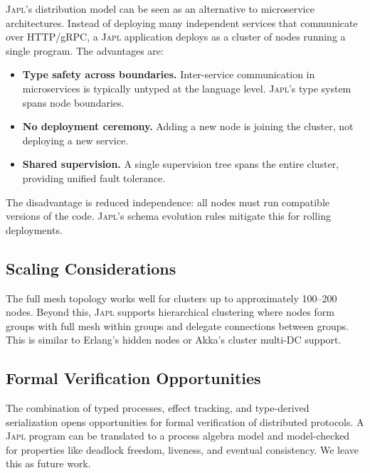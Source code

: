 \documentclass[11pt,a4paper]{article}
\newcommand{\japl}{\textsc{Japl}}
\begin{document}
\japl{}'s distribution model can be seen as an alternative to
microservice architectures. Instead of deploying many independent
services that communicate over HTTP/gRPC, a \japl{} application deploys
as a cluster of nodes running a single program. The advantages are:

\begin{itemize}[nosep]
  \item \textbf{Type safety across boundaries.} Inter-service communication
        in microservices is typically untyped at the language level.
        \japl{}'s type system spans node boundaries.
  \item \textbf{No deployment ceremony.} Adding a new node is joining
        the cluster, not deploying a new service.
  \item \textbf{Shared supervision.} A single supervision tree spans the
        entire cluster, providing unified fault tolerance.
\end{itemize}

The disadvantage is reduced independence: all nodes must run compatible
versions of the code. \japl{}'s schema evolution rules mitigate this for
rolling deployments.

\subsection{Scaling Considerations}

The full mesh topology works well for clusters up to approximately 100--200
nodes. Beyond this, \japl{} supports hierarchical clustering where nodes
form groups with full mesh within groups and delegate connections between
groups. This is similar to Erlang's hidden nodes or Akka's cluster
multi-DC support.

\subsection{Formal Verification Opportunities}

The combination of typed processes, effect tracking, and type-derived
serialization opens opportunities for formal verification of distributed
protocols. A \japl{} program can be translated to a process algebra
model and model-checked for properties like deadlock freedom, liveness,
and eventual consistency. We leave this as future work.


\end{document}
